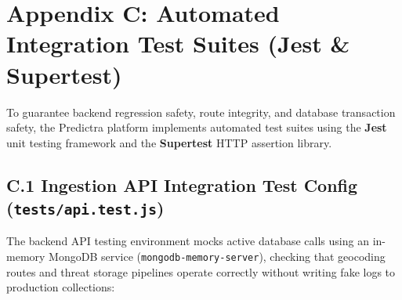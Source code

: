 \section*{Appendix C: Automated Integration Test Suites (Jest \& Supertest)}
To guarantee backend regression safety, route integrity, and database transaction safety, the Predictra platform implements automated test suites using the \textbf{Jest} unit testing framework and the \textbf{Supertest} HTTP assertion library.

\subsection*{C.1 Ingestion API Integration Test Config (\texttt{tests/api.test.js})}
The backend API testing environment mocks active database calls using an in-memory MongoDB service (\texttt{mongodb-memory-server}), checking that geocoding routes and threat storage pipelines operate correctly without writing fake logs to production collections:
